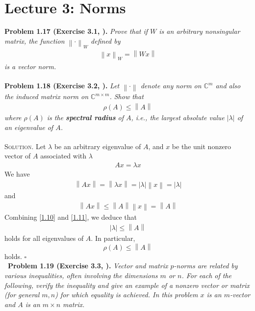 \documentclass[a4paper,oneside]{book}
\numberwithin{equation}{chapter}
\begin{document}
\section{Lecture 3: Norms}
\textbf{Problem 1.17 (Exercise 3.1, \cite{1}).}  \textit{Prove that if $W$ is an arbitrary nonsingular matrix, the function ${\left\|  \cdot  \right\|_W}$ defined by}
\begin{align}
{\left\| x \right\|_W} = \left\| {Wx} \right\|
\end{align}
\textit{is a vector norm.}\\
\\
\textbf{Problem 1.18 (Exercise 3.2, \cite{1}).} \textit{Let $\left\|  \cdot  \right\|$ denote any norm on $\mathbb{C}^m$ and also the induced matrix norm on $\mathbb{C}^{m\times m}$. Show that}
\begin{align}
\rho \left( A \right) \le \left\| A \right\|
\end{align}
\textit{where $\rho \left(A\right)$ is the \textbf{spectral radius} of $A$, i.e., the largest absolute value $\left|\lambda\right|$ of an eigenvalue of $A$.}\\
\\
\textsc{Solution.} Let $\lambda$ be an arbitrary eigenvalue of $A$, and $x$ be the unit nonzero vector of $A$ associated with $\lambda$
\begin{align}
Ax=\lambda x
\end{align}
We have
\begin{align}
\label{1.10}
\left\| {Ax} \right\| = \left\| {\lambda x} \right\| = \left| \lambda  \right|\left\| x \right\| = \left| \lambda  \right|
\end{align}
and
\begin{align}
\label{1.11}
\left\| {Ax} \right\| \le \left\| A \right\|\left\| x \right\| = \left\| A \right\|
\end{align}
Combining \eqref{1.10} and \eqref{1.11}, we deduce that
\begin{align}
\left| \lambda  \right| \le \left\| A \right\|
\end{align}
holds for all eigenvalues of $A$. In particular, 
\begin{equation}
\rho \left( A \right) \le \left\| A \right\|
\end{equation}
holds. \hfill $\square$\\
\
\textbf{Problem 1.19 (Exercise 3.3, \cite{1}).} \textit{Vector and matrix $p$-norms are related by various inequalities, often involving the dimensions $m$ or $n$. For each of the following, verify the inequality and give an example of a nonzero vector or matrix (for general $m,n$) for which equality is achieved. In this problem $x$ is an $m$-vector and $A$ is an $m\times n$ matrix.}
\end{document}

